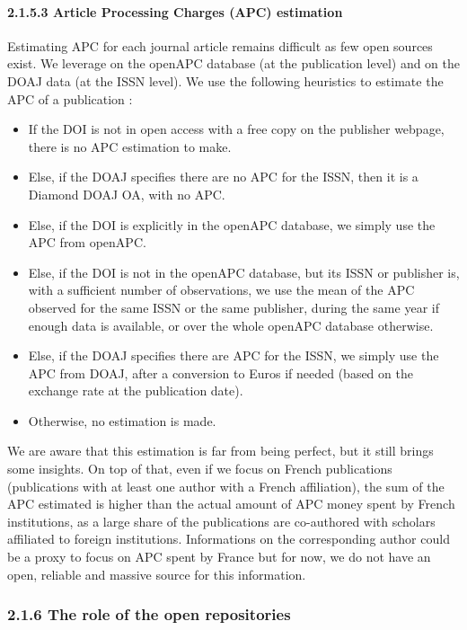 \documentclass[
]{article}
\begin{document}
\hypertarget{article-processing-charges-apc-estimation}{%
\paragraph{2.1.5.3 Article Processing Charges (APC)
estimation}\label{article-processing-charges-apc-estimation}}

Estimating APC for each journal article remains difficult as few open
sources exist. We leverage on the openAPC database (at the publication
level) and on the DOAJ data (at the ISSN level). We use the following
heuristics to estimate the APC of a publication :

\begin{itemize}
\item
  If the DOI is not in open access with a free copy on the publisher
  webpage, there is no APC estimation to make.
\item
  Else, if the DOAJ specifies there are no APC for the ISSN, then it is
  a Diamond DOAJ OA, with no APC.
\item
  Else, if the DOI is explicitly in the openAPC database, we simply use
  the APC from openAPC.
\item
  Else, if the DOI is not in the openAPC database, but its ISSN or
  publisher is, with a sufficient number of observations, we use the
  mean of the APC observed for the same ISSN or the same publisher,
  during the same year if enough data is available, or over the whole
  openAPC database otherwise.
\item
  Else, if the DOAJ specifies there are APC for the ISSN, we simply use
  the APC from DOAJ, after a conversion to Euros if needed (based on the
  exchange rate at the publication date).
\item
  Otherwise, no estimation is made.
\end{itemize}

We are aware that this estimation is far from being perfect, but it
still brings some insights. On top of that, even if we focus on French
publications (publications with at least one author with a French
affiliation), the sum of the APC estimated is higher than the actual
amount of APC money spent by French institutions, as a large share of
the publications are co-authored with scholars affiliated to foreign
institutions. Informations on the corresponding author could be a proxy
to focus on APC spent by France but for now, we do not have an open,
reliable and massive source for this information.

\hypertarget{the-role-of-the-open-repositories}{%
\subsubsection{2.1.6 The role of the open
repositories}\label{the-role-of-the-open-repositories}}
\end{document}
